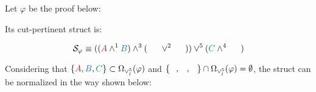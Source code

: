 \documentclass{llncs}
\begin{document}
\begin{example}
\label{example:PlusTimesSwappedDefinitionalNormalization}
Let $\varphi$ be the proof below:

\begin{prooftree}
		 
	 
						 
					 
					 
									 
								 
\end{prooftree}

Its cut-pertinent struct is:

$$
\cutpertstruct{\varphi} 
\equiv 
((\hA{A} \structplus^1 \hB{B}) \structplus^3 (\hC{\structdual{B}} \structtimes^2 \hD{\structdual{A}}))
\structtimes^5
(\hE{C} \structplus^4 \hF{\structdual{C}})
$$

Considering that $\{ \hA{A}, \hB{B}, \hE{C}\} \subset \occInference{\varphi}{\vee_l^5}$ and $\{ \hD{A}, \hC{B}, \hF{C} \} \cap \occInference{\varphi}{\vee_l^5} = \emptyset$, the struct can be normalized in the way shown below:


\end{example}
\end{document}
